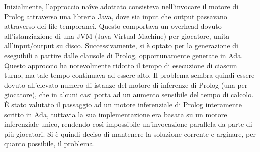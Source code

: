 Inizialmente, l'approccio naîve adottato consisteva nell'invocare il motore di Prolog attraverso una libreria Java, dove sia input che output passavano attraverso dei file temporanei. Questo comportava un overhead dovuto all'istanziazione di una JVM (Java Virtual Machine) per giocatore, unita all'input/output su disco. Successivamente, si è optato per la generazione di eseguibili a partire dalle clausole di Prolog, opportunamente generate in Ada. Questo approccio ha notevolmente ridotto il tempo di esecuzione di ciascun turno, ma tale tempo continuava ad essere alto. Il problema sembra quindi essere dovuto all'elevato numero di istanze del motore di inferenze di Prolog (una per giocatore), che in alcuni casi porta ad un aumento sensibile del tempo di calcolo.\\

È stato valutato il passaggio ad un motore inferenziale di Prolog interamente scritto in Ada, tuttavia la sua implementazione era basata su un motore inferenziale unico, rendendo così impossibile un'invocazione parallela da parte di più giocatori. Si è quindi deciso di mantenere la soluzione corrente e arginare, per quanto possibile, il problema.